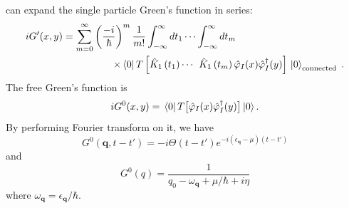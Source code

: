 \documentclass[12pt]{article}
\begin{document}
can expand the single particle Green's function in series:
\begin{equation}
    \begin{aligned}
        i G^{\prime}(x, y)=\sum_{m=0}^{\infty}\left(\frac{-i}{\hbar}\right)^{m}
        \frac{1}{m !} \int_{-\infty}^{\infty} d t_{1}\cdots&\int_{-\infty}^{\infty} d t_{m} \\
        \times\bra*{0} T\left[\hat{K}_{1}\left(t_{1}\right)\cdots\right.&\left.
        \hat{K}_{1}\left(t_{m}\right)\hat{\varphi}_{I}(x) \hat{\varphi}_{I}^{\dagger}
        (y)\right]\ket*{0}_{\text {connected }}.
        \end{aligned}
\end{equation}
The free Green's function is
\begin{equation}
    iG^0(x,y)=\bra*{0}T\big[\hat{\varphi}_I(x)\hat{\varphi}^\dagger_I(y)\big]\ket*{0}.
\end{equation}
By performing Fourier transform on it, we have 
\begin{equation}
    G^0(\mathbf{q},t-t')=-i\Theta(t-t')e^{-i(\epsilon_{\mathbf{q}}-\mu)(t-t')}
\end{equation}
and 
\begin{equation}
    G^0(q)=\frac{1}{q_0-\omega_{\mathbf{q}}+\mu/\hbar+i\eta}
\end{equation}
where $\omega_{\mathbf{q}}=\epsilon_{\mathbf{q}}/\hbar$.
\end{document}
